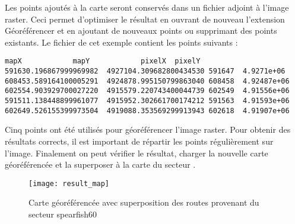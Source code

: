 
Les points ajout\'es \`a la carte seront conserv\'es dans un fichier  adjoint \`a l'image raster.
Ceci permet d'optimiser le r\'esultat en ouvrant de nouveau l'extension G\'eor\'ef\'erencer et en ajoutant de nouveaux points ou supprimant des points existants.
Le fichier  de cet exemple contient les points suivants :

\begin{verbatim}
mapX    		mapY    		pixelX  pixelY
591630.196867999969982  4927104.309682800434530 591647  4.9271e+06
608453.589164100005291  4924878.995150799863040 608458  4.92487e+06
602554.903929700027220  4915579.220743400044739 602549  4.91556e+06
591511.138448899961077  4915952.302661700174212 591563  4.91593e+06
602649.526155399973504  4919088.353569299913943 602618  4.91907e+06
\end{verbatim} 


Cinq points ont \'et\'e utilis\'es pour g\'eor\'ef\'erencer l'image raster.
Pour obtenir des r\'esultats corrects, il est important de r\'epartir les points r\'eguli\`erement sur l'image.
Finalement on peut v\'erifier le r\'esultat, charger la nouvelle carte g\'eor\'ef\'erenc\'ee  et la superposer \`a la carte  du secteur .


\begin{figure}[ht]
\begin{center}
  \caption{Carte g\'eor\'ef\'erenc\'ee avec superposition des routes provenant du secteur spearfish60
  \nixcaption}\label{fig:result_map}\smallskip
  \texttt{[image: result\_map]}
\end{center}
\end{figure}
